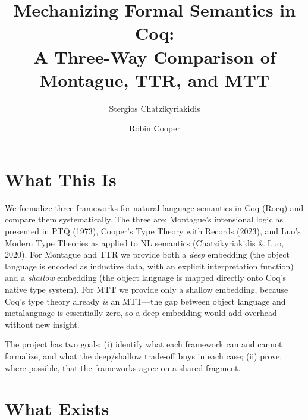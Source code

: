 \documentclass[11pt,a4paper]{article}
\title{Mechanizing Formal Semantics in Coq:\\A Three-Way Comparison of Montague, TTR, and MTT}
\author{Stergios Chatzikyriakidis \and Robin Cooper}
\date{}
\begin{document}
\maketitle
\thispagestyle{empty}

\section{What This Is}

We formalize three frameworks for natural language semantics in Coq (Rocq) and compare them systematically. The three are: Montague's intensional logic as presented in PTQ (1973), Cooper's Type Theory with Records (2023), and Luo's Modern Type Theories as applied to NL semantics (Chatzikyriakidis \& Luo, 2020). For Montague and TTR we provide both a \emph{deep} embedding (the object language is encoded as inductive data, with an explicit interpretation function) and a \emph{shallow} embedding (the object language is mapped directly onto Coq's native type system). For MTT we provide only a shallow embedding, because Coq's type theory already \emph{is} an MTT---the gap between object language and metalanguage is essentially zero, so a deep embedding would add overhead without new insight.

The project has two goals: (i) identify what each framework can and cannot formalize, and what the deep/shallow trade-off buys in each case; (ii) prove, where possible, that the frameworks agree on a shared fragment.

\section{What Exists}
\end{document}
